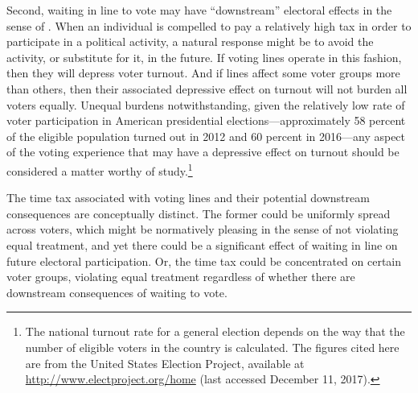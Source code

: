 \documentclass[12pt,titlepage]{article}
\begin{document}
Second, waiting in line to vote may have ``downstream'' electoral
effects in the sense of
\citet{pettigrew:longlinesminorityprecincts}. When an individual is
compelled to pay a relatively high tax in order to participate in a
political activity, a natural response might be to avoid the activity,
or substitute for it, in the future. If voting lines operate in this
fashion, then they will depress voter turnout. And if lines affect
some voter groups more than others, then their associated depressive
effect on turnout will not burden all voters equally. Unequal burdens
notwithstanding, given the relatively low rate of voter participation
in American presidential elections---approximately 58 percent of the
eligible population turned out in 2012 and 60 percent in 2016---any
aspect of the voting experience that may have a depressive effect on
turnout should be considered a matter worthy of study.\footnote{The
  national turnout rate for a general election
  depends on the way that the number of eligible voters in the country
  is calculated.  The figures cited here are from the United States
  Election Project, available at
  \url{http://www.electproject.org/home} (last accessed December 11,
  2017).\label{fn:uselectionproject}}



The time tax associated with voting lines and their potential
downstream consequences are conceptually distinct. The former could be
uniformly spread across voters, which might be normatively pleasing in
the sense of not violating equal treatment, and yet there could be a
significant effect of waiting in line on future electoral
participation. Or, the time tax could be concentrated on certain voter
groups, violating equal treatment regardless of whether there are
downstream consequences of waiting to vote.
\end{document}
